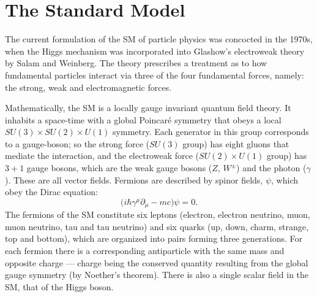 \section{The Standard Model}
The current formulation of the SM of particle physics was concocted in the 1970s, when the Higgs
mechanism was incorporated into Glashow's electroweak theory by Salam and Weinberg.
The theory prescribes a treatment
as to how fundamental particles interact via three of the four
fundamental forces, namely: the strong, weak and electromagnetic forces.


Mathematically, the SM is a locally gauge invariant quantum field theory.
It inhabits a space-time with a global Poincar\'e symmetry that obeys a local
$SU(3)\times SU(2)\times U(1)$ symmetry.
Each generator in this group corresponds to a gauge-boson; so the strong force ($SU(3)$ group) has
eight gluons that mediate the interaction, and the electroweak force ($SU(2)\times U(1)$ group) has
$3+1$ gauge bosons, which are the weak gauge bosons ($Z$, $W^\pm$) and the photon ($\gamma$).
These are all vector fields.
Fermions are described by spinor fields, $\psi$, which obey the Dirac equation:
\begin{equation}
  \big(i\hbar\gamma^\mu\partial_\mu - mc\big)\psi = 0.
  \label{th:eq:dirac}
\end{equation}
The fermions of the SM constitute six leptons (electron, electron neutrino, muon, muon neutrino,
tau and tau neutrino) and six quarks (up, down, charm, strange, top and bottom), which are
organized into pairs forming three generations.
For each fermion there is a corresponding antiparticle with the same mass and opposite charge ---
charge being the conserved quantity resulting from the global gauge symmetry (by Noether's
theorem).
There is also a single scalar field in the SM, that of the Higgs boson.

